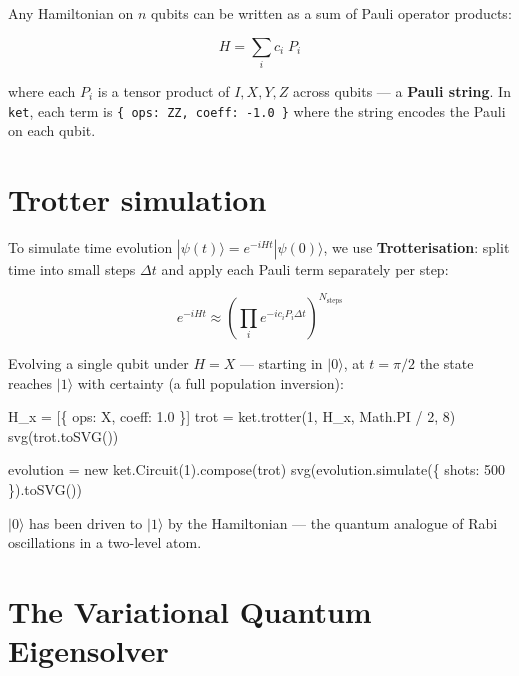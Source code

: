 \documentclass[
  11pt,
  letterpaper,
  oneside]{scrbook}
\newenvironment{Shaded}{\begin{snugshade}}{\end{snugshade}}
\newcommand{\NormalTok}[1]{\textcolor[rgb]{0.00,0.23,0.31}{#1}}
\begin{document}
Any Hamiltonian on \(n\) qubits can be written as a sum of Pauli
operator products:

\[H = \sum_i c_i \; P_i\]

where each \(P_i\) is a tensor product of \(I, X, Y, Z\) across qubits
--- a \textbf{Pauli string}. In \texttt{ket}, each term is
\texttt{\{\ ops:\ \textquotesingle{}ZZ\textquotesingle{},\ coeff:\ -1.0\ \}}
where the string encodes the Pauli on each qubit.

\section{Trotter simulation}\label{trotter-simulation}

To simulate time evolution
\(|\psi(t)\rangle = e^{-iHt}|\psi(0)\rangle\), we use
\textbf{Trotterisation}: split time into small steps \(\Delta t\) and
apply each Pauli term separately per step:

\[e^{-iHt} \approx \left(\prod_i e^{-ic_i P_i \Delta t}\right)^{N_\text{steps}}\]

Evolving a single qubit under \(H = X\) --- starting in \(|0\rangle\),
at \(t = \pi/2\) the state reaches \(|1\rangle\) with certainty (a full
population inversion):

\begin{Shaded}
\begin{Highlighting}[]
\NormalTok{H\_x = [\{ ops: \textquotesingle{}X\textquotesingle{}, coeff: 1.0 \}]}
\NormalTok{trot = ket.trotter(1, H\_x, Math.PI / 2, 8)}
\NormalTok{svg(trot.toSVG())}
\end{Highlighting}
\end{Shaded}

\begin{Shaded}
\begin{Highlighting}[]
\NormalTok{evolution = new ket.Circuit(1).compose(trot)}
\NormalTok{svg(evolution.simulate(\{ shots: 500 \}).toSVG())}
\end{Highlighting}
\end{Shaded}

\(|0\rangle\) has been driven to \(|1\rangle\) by the Hamiltonian ---
the quantum analogue of Rabi oscillations in a two-level atom.

\section{The Variational Quantum
Eigensolver}\label{the-variational-quantum-eigensolver}
\end{document}
